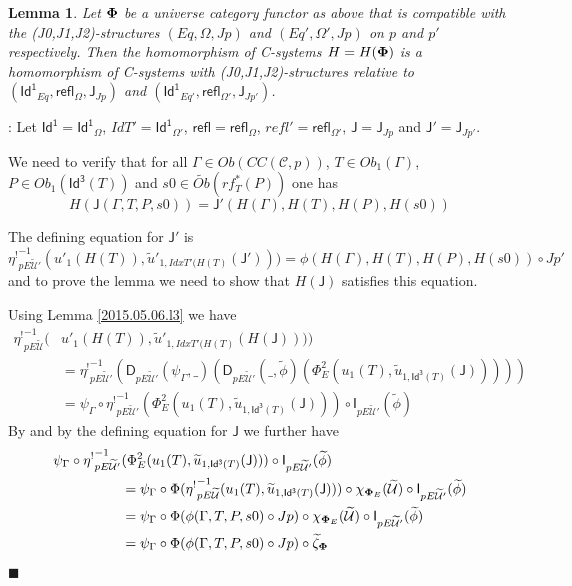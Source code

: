 \documentclass[12pt]{article}
\numberwithin{equation}{section}
\newenvironment{myproof}{{\bf Proof}:}{$\blacksquare$ \vskip 5mm }
\newtheorem{lemma}[proposition]{Lemma}
\newcommand{\llabel}[1]{\label{#1}}
\newcommand{\wt}{\widetilde}
\newcommand{\toCC}{CC} %
\newcommand{\Id}{\mathsf{Id^1}} %
\newcommand{\Idx}{\mathsf{Id^3}} %
\newcommand{\refl}{\mathsf{refl}}
\newcommand{\J}{\mathsf{J}}
\newcommand{\U}{\mathcal{U}}
\newcommand{\D}{\mathsf{D}}
\newcommand{\I}{\mathsf{I}}
\newcommand{\etashriek}{\eta^!}
\newcommand{\etaunshriek}{{\etashriek}^{-1}}
\begin{document}
\begin{lemma}
\llabel{2015.04.12.l3} Let ${\bf\Phi}$ be a universe category functor as above
that is compatible with the (J0,J1,J2)-structures $(Eq,\Omega,Jp)$ and
$(Eq',\Omega',Jp)$ on $p$ and $p'$ respectively. Then the homomorphism of
C-systems $H=H({\bf\Phi})$ is a homomorphism of C-systems with
(J0,J1,J2)-structures relative to $(\Id_{Eq},\refl_{\Omega},\J_{Jp})$ and
$(\Id_{Eq'},\refl_{\Omega'},\J_{Jp'})$.
\end{lemma}
%
\begin{myproof}
Let $\Id=\Id_{\Omega}$, $IdT'=\Id_{\Omega'}$, $\refl=\refl_{\Omega}$,
$refl'=\refl_{\Omega'}$, $\J=\J_{Jp}$ and $\J'=\J_{Jp'}$.

We need to verify that for all $\Gamma\in Ob(\toCC({\mathcal C},p))$, $T\in
Ob_1(\Gamma)$, $P\in Ob_1(\Idx(T))$ and $s0\in \wt{Ob}(rf^*_T(P))$ one has
%
$$H(\J(\Gamma,T,P,s0))=\J'(H(\Gamma),H(T),H(P),H(s0))$$
%

The defining equation for $\J'$ is
%
$$\etaunshriek_{pE\wt{\U}'}(u'_1(H(T)),\wt{u}'_{1,{IdxT'(H(T)}}(\J')))=\phi(H(\Gamma),H(T),H(P),H(s0))\circ
Jp'$$
%
and to prove the lemma we need to show that $H(\J)$ satisfies this equation.

Using Lemma \ref{2015.05.06.l3} we have
%
\begin{align*}
  \etaunshriek_{pE\wt{\U}}(&u'_1(H(T)),\wt{u}'_{1,{IdxT'(H(T)}}(H(\J)))) \\
    & = \etaunshriek_{pE\wt{\U}'}(\D_{pE\wt{\U}'}(\psi_{\Gamma},\_)(\D_{pE\wt{\U}'}(\_,\wt{\phi})(\Phi_E^2(u_1(T),\wt{u}_{1,\Idx(T)}(\J))))) \\
    & = \psi_{\Gamma}\circ \etaunshriek_{pE\wt{\U}'}(\Phi_E^2(u_1(T),\wt{u}_{1,\Idx(T)}(\J)))\circ \I_{pE\wt{\U}'}(\wt{\phi})
\end{align*}
%
By \cite[Lemma 5.8]{fromunivwithPi} and by the defining equation for $\J$ we
further have
%
\begin{align*}
  \psi_{\Gamma}\circ \etaunshriek_{pE\wt{\U}'}&(\Phi_E^2(u_1(T),\wt{u}_{1,\Idx(T)}(\J)))\circ \I_{pE\wt{\U}'}(\wt{\phi}) \\
    & = \psi_{\Gamma}\circ \Phi(\etaunshriek_{pE\wt{\U}}(u_1(T),\wt{u}_{1,\Idx(T)}(\J)))\circ \chi_{{\bf\Phi}_E}(\wt{\U})\circ \I_{pE\wt{\U}'}(\wt{\phi}) \\
    & = \psi_{\Gamma}\circ \Phi(\phi(\Gamma,T,P,s0)\circ Jp)\circ \chi_{{\bf\Phi}_E}(\wt{\U})\circ \I_{pE\wt{\U}'}(\wt{\phi}) \\
    & = \psi_{\Gamma}\circ \Phi(\phi(\Gamma,T,P,s0)\circ Jp)\circ \wt{\zeta}_{\bf\Phi}
\end{align*}
%


\end{myproof}
\end{document}
